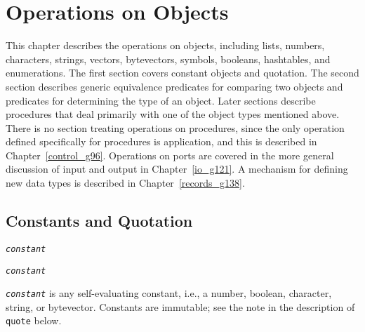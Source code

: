 \chapter{Operations on Objects\label{objects_CHPTOBJECTS}}
\label{objects_g106}
\label{objects_h0}
\begin{figure}[H]
\centering
\setlength{\fboxrule}{3pt}
\end{figure}
\clearpage





This chapter describes the \label{objects_s0}operations on objects, including lists,
numbers, characters, strings, vectors, bytevectors, symbols, booleans, hashtables, and enumerations.
The first section covers constant objects and quotation.
The second section describes generic equivalence predicates for
comparing two objects and predicates for determining the type
of an object.
Later sections describe procedures that deal primarily with one of
the object types mentioned above.
There is no section treating operations on procedures, since the only
operation defined specifically for procedures is application, and this
is described in Chapter \ref{control_g96}.
Operations on ports are covered in the more general discussion of
input and output in Chapter \ref{io_g121}.
A mechanism for defining new data types is described in
Chapter \ref{records_g138}.


\section{\label{objects_g107}\label{objects_h1}Constants and Quotation\label{objects_SECTQUOTING}}


\begin{description}

\label{objects_s1}\item[syntax] \texttt{\textit{constant}}



\item[returns] \texttt{\textit{constant}}
\end{description}

\texttt{\textit{constant}} is any self-evaluating constant, i.e., a number,
boolean, character, string, or bytevector.
Constants are immutable; see the note in the description of
\texttt{quote} below.

